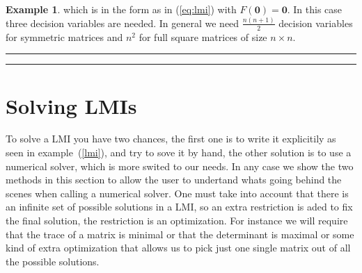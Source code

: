 \documentclass[nols]{tufte-handout}
\theoremstyle{definition}
\newtheorem{exmp}{Example}[section]
\newcommand{\chapter}[1]{\section{#1}}
\begin{document}
\begin{exmp}
which is in the form as in (\ref{eq:lmi}) with $F(\mathbf{0}) = \mathbf{0}$. In this case three decision variables are
needed. In general we need $\frac{n(n + 1)}{2}$ decision variables for symmetric matrices and $n^2$ for full square matrices of size $n\times n$.

\end{exmp}
\hrule
\hrule
\vspace{0.5cm}

\chapter{Solving LMIs}
To solve a LMI you have two chances, the first one is to write it explicitily as seen in example~(\ref{lmi}), and try to sove it by hand, the other solution is to use a numerical solver, which is more swited to our needs. In any case we show the two methods in this section to allow the user to undertand whats going behind the scenes when calling a numerical solver. One must take into account that there is an infinite set of possible solutions in a LMI, so an extra restriction is aded to fix the final solution, the restriction is an optimization. For instance we will require that the trace of a matrix is minimal or that the determinant is maximal or some kind of extra optimization that allows us to pick just one single matrix out of all the possible solutions.
\end{document}
